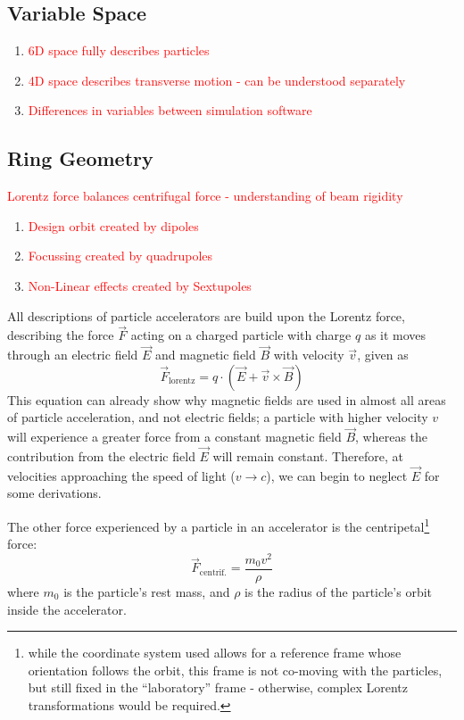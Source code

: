 \documentclass[11pt]{report}
\newcommand\todo[1]{\textcolor{red}{#1}}
\begin{document}
\subsection{Variable Space}
\begin{enumerate}
  \item \todo{6D space fully describes particles}
  \item \todo{4D space describes transverse motion - can be understood separately}
  \item \todo{Differences in variables between simulation software}
\end{enumerate}


\subsection{Ring Geometry}

\todo{Lorentz force balances centrifugal force - understanding of beam rigidity}
\begin{enumerate}
    \item \todo{Design orbit created by dipoles}
    \item \todo{Focussing created by quadrupoles}
    \item \todo{Non-Linear effects created by Sextupoles}
\end{enumerate}


All descriptions of particle accelerators are build upon the Lorentz force, describing the force $\vec F$ acting on a charged particle with charge $q$ as it moves through an electric field $\vec E$ and magnetic field $\vec B$ with velocity $\vec v$, given as
\begin{equation}
\vec F_{\text{lorentz}} = q\cdot(\vec E+ \vec v\times\vec B)\label{eq:lorentz}
\end{equation}
This equation can already show why magnetic fields are used in almost all areas of particle acceleration, and not electric fields; a particle with higher velocity $v$ will experience a greater force from a constant magnetic field $\vec B$, whereas the contribution from the electric field $\vec E$ will remain constant. Therefore, at velocities approaching the speed of light ($v \rightarrow c$), we can begin to neglect $\vec E$ for some derivations.

The other force experienced by a particle in an accelerator is the centripetal\footnote{while the coordinate system used allows for a reference frame whose orientation follows the orbit, this frame is not co-moving with the particles, but still fixed in the ``laboratory'' frame - otherwise, complex Lorentz transformations would be required.} force:
\begin{equation}
\vec F_{\text{centrif.}}=\frac{m_0v^2}{\rho}\label{eq:centrifugal}
\end{equation} where $m_0$ is the particle's rest mass, and $\rho$ is the radius of the particle's orbit inside the accelerator.
\end{document}
